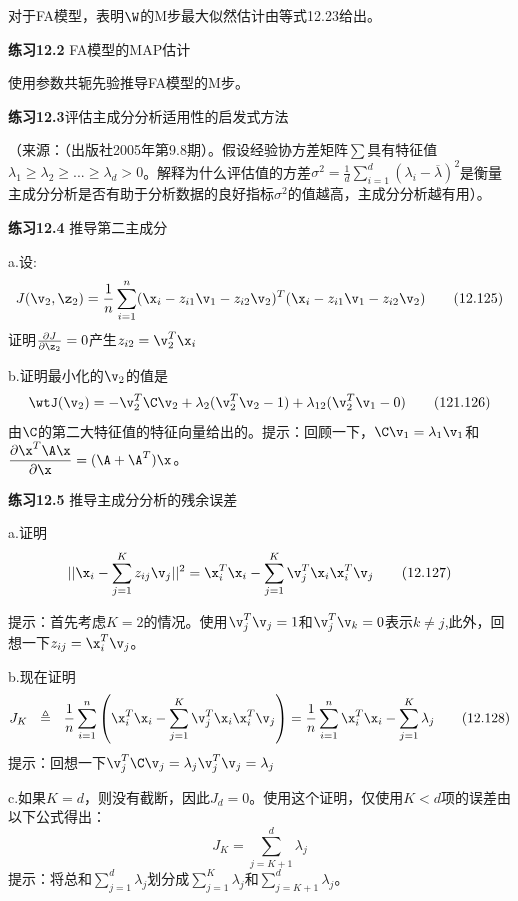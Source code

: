 \documentclass[a4paper]{article}
\begin{document}
对于FA模型，表明$\W$的M步最大似然估计由等式12.23给出。 

\textbf{练习12.2} FA模型的MAP估计 

使用参数共轭先验推导FA模型的M步。 

\textbf{练习12.3}评估主成分分析适用性的启发式方法 

（来源：（出版社2005年第9.8期）。假设经验协方差矩阵$\textstyle{\sum}$具有特征值$\lambda_1\ge \lambda_2\ge ...\ge \lambda_d>0$。解释为什么评估值的方差$\sigma^2=\frac{1}{d}\sum\nolimits_{i=1}^d(\lambda_i-\overline{\lambda})^2$是衡量主成分分析是否有助于分析数据的良好指标$\sigma^2$的值越高，主成分分析越有用）。 

\textbf{练习12.4} 推导第二主成分

a.设:
\begin{equation}
	J(\v_2,\z_2)=\frac{1}{n}\sum_{i=1}^{n}(\x_i-z_{i1}\v_1-z_{i2}\v_2)^T(\x_i-z_{i1}\v_1-z_{i2}\v_2)\tag{12.125}
\end{equation}
证明$\frac{\partial J}{\partial \z_2}=0$产生$z_{i2}=\v_2^T\x_i$

b.证明最小化的$\v_2$的值是
\begin{equation}
	\wtJ(\v_2)=-\v_2^T\C\v_2+\lambda_2(\v_2^T\v_2-1)+\lambda_{12}(\v_2^T\v_1-0)\tag{121.126}
\end{equation}
由$\C$的第二大特征值的特征向量给出的。提示：回顾一下，$\C\v_1=\lambda_1\v_1$和$\dfrac{\partial \x^T\A\x}{\partial \x}=(\A+\A^T)\x$。

\textbf{练习12.5} 推导主成分分析的残余误差 

a.证明
\begin{equation}
	||\x_i-\sum_{j=1}^{K}z_{ij}\v_j||^2=\x_i^T\x_i-\sum_{j=1}^{K}\v_j^T\x_i\x_i^T\v_j\tag{12.127}
\end{equation}

提示：首先考虑$K=2$的情况。使用$\v_j^T\v_j=1$和$\v_j^T\v_k=0$表示$k\ne j$,此外，回想一下$z_{ij}=\x_i^T\v_j$。 

b.现在证明
\begin{equation}
	J_K\ \ \triangleq\ \ \frac{1}{n}\sum_{i=1}^{n}\left(\x_i^T\x_i-\sum_{j=1}^{K}\v_j^T\x_i\x_i^T\v_j\right)=\frac{1}{n}\sum_{i=1}^{n}\x_i^T\x_i-\sum_{j=1}^{K}\lambda_j\tag{12.128}
\end{equation}
提示：回想一下$\v_j^T\C\v_j=\lambda_j\v_j^T\v_j=\lambda_j$

c.如果$K=d$，则没有截断，因此$J_d=0$。使用这个证明，仅使用$K<d$项的误差由以下公式得出： 
\begin{equation}
	J_K=\sum_{j=K+1}^{d}\lambda_j\tag{12.129}
\end{equation}
提示：将总和$\sum\nolimits_{j=1}^{d}\lambda_j$划分成$\sum\nolimits_{j=1}^{K}\lambda_j$和$\sum\nolimits_{j=K+1}^{d}\lambda_j$。
\end{document}
